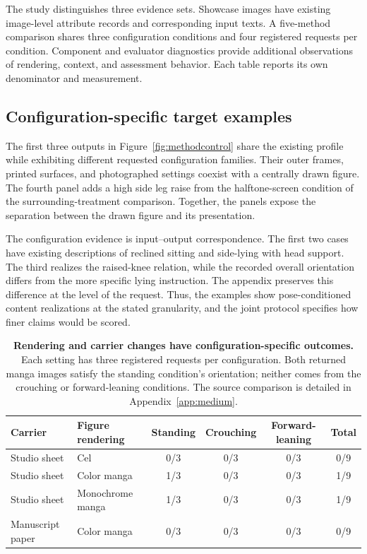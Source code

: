 The study distinguishes three evidence sets. Showcase images have existing image-level attribute records and corresponding input texts. A five-method comparison shares three configuration conditions and four registered requests per condition. Component and evaluator diagnostics provide additional observations of rendering, context, and assessment behavior. Each table reports its own denominator and measurement.

\subsection{Configuration-specific target examples}
The first three outputs in Figure~\ref{fig:methodcontrol} share the existing profile \jointtarget{} while exhibiting different requested configuration families. Their outer frames, printed surfaces, and photographed settings coexist with a centrally drawn figure. The fourth panel adds a high side leg raise from the halftone-screen condition of the surrounding-treatment comparison. Together, the panels expose the separation between the drawn figure and its presentation.

The configuration evidence is input--output correspondence. The first two cases have existing descriptions of reclined sitting and side-lying with head support. The third realizes the raised-knee relation, while the recorded overall orientation differs from the more specific lying instruction. The appendix preserves this difference at the level of the request. Thus, the examples show pose-conditioned content realizations at the stated granularity, and the joint protocol specifies how finer claims would be scored.



\begin{table}[t]
\centering\small
\begin{tabularx}{\textwidth}{@{}YYcccc@{}}
\toprule
Carrier & Figure rendering & Standing & Crouching & Forward-leaning & Total \\
\midrule
Studio sheet & Cel & 0/3 & 0/3 & 0/3 & 0/9 \\
Studio sheet & Color manga & 1/3 & 0/3 & 0/3 & 1/9 \\
Studio sheet & Monochrome manga & 1/3 & 0/3 & 0/3 & 1/9 \\
Manuscript paper & Color manga & 0/3 & 0/3 & 0/3 & 0/9 \\
\bottomrule
\end{tabularx}
\caption{\textbf{Rendering and carrier changes have configuration-specific outcomes.} Each setting has three registered requests per configuration. Both returned manga images satisfy the standing condition's orientation; neither comes from the crouching or forward-leaning conditions. The source comparison is detailed in Appendix~\ref{app:medium}.}
\label{tab:rendering}
\end{table}

